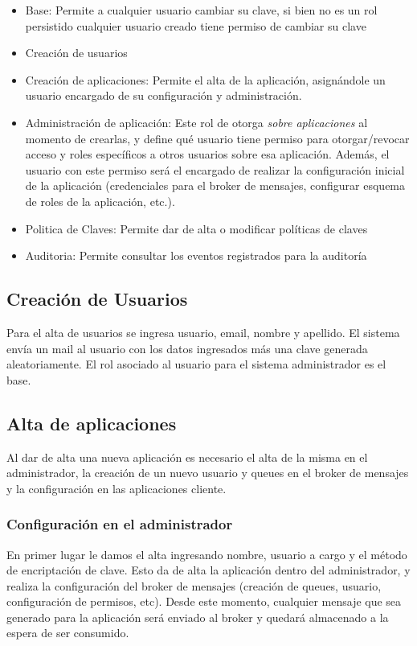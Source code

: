 \begin{itemize}
\item Base: Permite a cualquier usuario cambiar su clave, si bien no es un rol persistido cualquier usuario creado tiene permiso de cambiar su clave
\item Creación de usuarios
\item Creación de aplicaciones: Permite el alta de la aplicación, asignándole un usuario encargado de su configuración
y administración.
\item Administración de aplicación: Este rol de otorga \textit{sobre aplicaciones} al momento de crearlas, y 
define qué usuario tiene permiso para otorgar/revocar acceso y roles específicos a otros usuarios sobre esa 
aplicación. Además, el usuario con este permiso será el encargado de realizar la configuración inicial de la
aplicación (credenciales para el broker de mensajes, configurar esquema de roles de la aplicación, etc.).
\item Politica de Claves: Permite dar de alta o modificar políticas de claves
\item Auditoria: Permite consultar los eventos registrados para la auditoría
\end{itemize}


\subsection{Creación de Usuarios}

Para el alta de usuarios se ingresa usuario, email, nombre y apellido.
El sistema envía un mail al usuario con los datos ingresados más una clave generada aleatoriamente. El rol asociado al usuario para el sistema administrador es el base. 

\subsection{Alta de aplicaciones}
Al dar de alta una nueva aplicación es necesario el alta de la misma en el administrador, la creación de un nuevo
usuario y queues en el broker de mensajes y la configuración en las aplicaciones cliente.
 
\subsubsection{Configuración en el administrador}
En primer lugar le damos el alta ingresando nombre, usuario a cargo y el método de encriptación de clave. Esto
da de alta la aplicación dentro del administrador, y realiza la configuración del broker de mensajes (creación
de queues, usuario, configuración de permisos, etc). Desde este momento, cualquier mensaje que sea generado
para la aplicación será enviado al broker y quedará almacenado a la espera de ser consumido.

